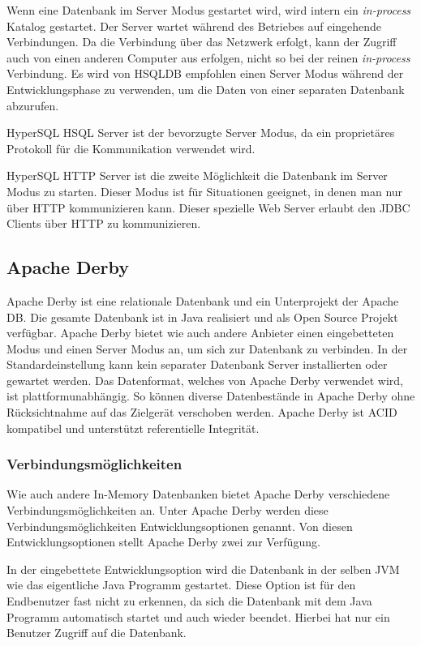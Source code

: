 \documentclass[draft,final]{vutinfth} %
\begin{document}
Wenn eine Datenbank im Server Modus gestartet wird, wird intern ein \textit{in-process} Katalog gestartet. Der Server wartet während des Betriebes auf eingehende Verbindungen. Da die Verbindung über das Netzwerk erfolgt, kann der Zugriff auch von einen anderen Computer aus erfolgen, nicht so bei der reinen \textit{in-process} Verbindung. Es wird von HSQLDB empfohlen einen Server Modus während der Entwicklungsphase zu verwenden, um die Daten von einer separaten Datenbank abzurufen.

HyperSQL HSQL Server ist der bevorzugte Server Modus, da ein proprietäres Protokoll für die Kommunikation verwendet wird.

HyperSQL HTTP Server ist die zweite Möglichkeit die Datenbank im Server Modus zu starten. Dieser Modus ist für Situationen geeignet, in denen man nur über HTTP kommunizieren kann. Dieser spezielle Web Server erlaubt den JDBC Clients über HTTP zu kommunizieren. 

\cite{HSQLGuide}

\subsection{Apache Derby}
Apache Derby ist eine relationale Datenbank und ein Unterprojekt der Apache DB. Die gesamte Datenbank ist in Java realisiert und als Open Source Projekt verfügbar. Apache Derby bietet wie auch andere Anbieter einen eingebetteten Modus und einen Server Modus an, um sich zur Datenbank zu verbinden. In der Standardeinstellung kann kein separater Datenbank Server installierten oder gewartet werden. Das Datenformat, welches von Apache Derby verwendet wird, ist plattformunabhängig. So können diverse Datenbestände in Apache Derby ohne Rücksichtnahme auf das Zielgerät verschoben werden. Apache Derby ist ACID kompatibel und unterstützt referentielle Integrität.

\subsubsection*{Verbindungsmöglichkeiten}
Wie auch andere In-Memory Datenbanken bietet Apache Derby verschiedene Verbindungsmöglichkeiten an. Unter Apache Derby werden diese Verbindungsmöglichkeiten Entwicklungsoptionen genannt. Von diesen Entwicklungsoptionen stellt Apache Derby zwei zur Verfügung. 

In der eingebettete Entwicklungsoption wird die Datenbank in der selben JVM wie das eigentliche Java Programm gestartet. Diese Option ist für den Endbenutzer fast nicht zu erkennen, da sich die Datenbank mit dem Java Programm automatisch startet und auch wieder beendet. Hierbei hat nur ein Benutzer Zugriff auf die Datenbank.
\end{document}
